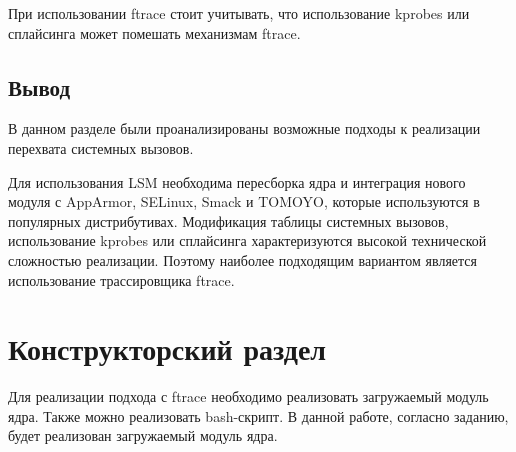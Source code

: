 \documentclass[a4paper,14pt]{article}
\begin{document}
При использовании ftrace стоит учитывать, что использование kprobes или сплайсинга может помешать меха­низмам ftrace.

\subsection{Вывод}

В данном разделе были проанализированы возможные подходы к реализации перехвата системных вызовов.

Для использования LSM необходима пересборка ядра и интеграция нового модуля с AppArmor, SELinux, Smack и TOMOYO, которые используются в популярных дистрибутивах. Модификация таблицы системных вызовов, использование kprobes или сплайсинга характеризуются высокой технической сложностью реализации. Поэтому наиболее подходящим вариантом является использование трассировщика ftrace.

\newpage
\section{Конструкторский раздел}


Для реализации подхода с ftrace необходимо реализовать загружаемый модуль ядра. Также можно реализовать bash-скрипт. В данной работе, согласно заданию, будет реализован загружаемый модуль ядра.
\end{document}
